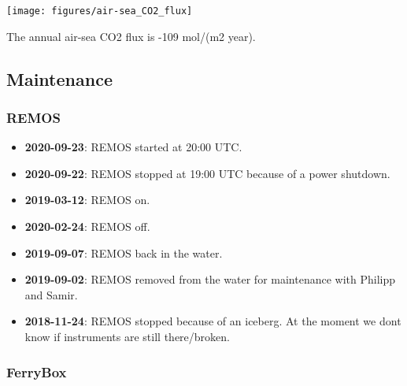 \documentclass[
]{article}
\providecommand{\tightlist}{%
  \setlength{\itemsep}{0pt}\setlength{\parskip}{0pt}}
\begin{document}
\texttt{[image: figures/air-sea\_CO2\_flux]}

The annual air-sea CO2 flux is -109 mol/(m2 year).

\hypertarget{maintenance}{%
\subsection{Maintenance}\label{maintenance}}

\hypertarget{remos}{%
\subsubsection{\texorpdfstring{\textbf{REMOS}}{REMOS}}\label{remos}}

\begin{itemize}
\tightlist
\item
  \textbf{2020-09-23}: REMOS started at 20:00 UTC.
\item
  \textbf{2020-09-22}: REMOS stopped at 19:00 UTC because of a power
  shutdown.
\item
  \textbf{2019-03-12}: REMOS on.
\item
  \textbf{2020-02-24}: REMOS off.
\item
  \textbf{2019-09-07}: REMOS back in the water.
\item
  \textbf{2019-09-02}: REMOS removed from the water for maintenance with
  Philipp and Samir.
\item
  \textbf{2018-11-24}: REMOS stopped because of an iceberg. At the
  moment we dont know if instruments are still there/broken.
\end{itemize}

\hypertarget{ferrybox}{%
\subsubsection{\texorpdfstring{\textbf{FerryBox}}{FerryBox}}\label{ferrybox}}
\end{document}
